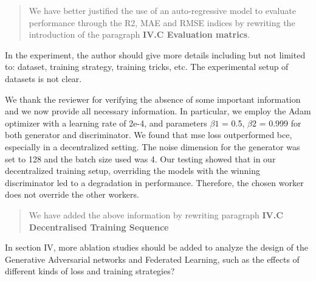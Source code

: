 \documentclass{article}
\begin{document}


\begin{quote}
We have better justified the use of an auto-regressive model to evaluate performance through the R2, MAE and RMSE indices by rewriting the introduction of the paragraph \textbf{IV.C Evaluation matrics}.
\end{quote}

\RC In the experiment, the author should give more details including but not limited to: dataset, training strategy, training tricks, etc. The experimental setup of datasets is not clear.

\AR We thank the reviewer for verifying the absence of some important information and we now provide all necessary information.
In particular, we employ the Adam optimizer with a learning rate of 2e-4, and parameters $\beta1$ = 0.5, $\beta2$ = 0.999 for both generator and discriminator.
We found that \gls*{mse} loss outperformed \gls*{bce}, especially in a decentralized setting. The noise dimension for the generator was set to 128 and the batch size used was 4. 
Our testing showed that in our decentralized training setup, overriding the models with the winning discriminator led to a degradation in performance. Therefore, the chosen worker does not override the other workers.


\begin{quote}
We have added the above information by rewriting paragraph \textbf{IV.C Decentralised Training Sequence}
\end{quote}

\RC In section IV, more ablation studies should be added to analyze the design of the Generative Adversarial networks and Federated Learning, such as the effects of different kinds of loss and training strategies?
\end{document}
